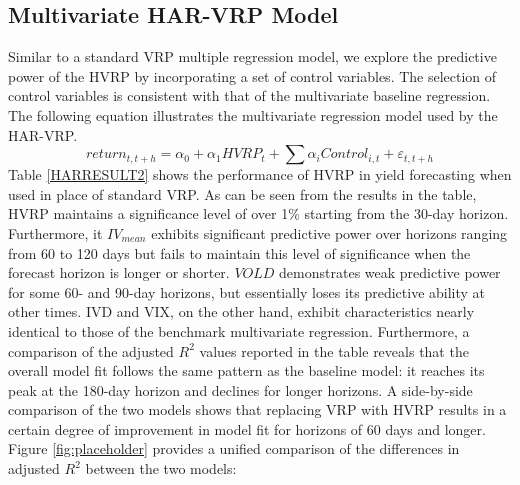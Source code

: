 \documentclass[a4paper, 12pt]{article}    %
\begin{document}
\subsection{Multivariate HAR-VRP Model}
Similar to a standard VRP multiple regression model, we explore the predictive power of the HVRP by incorporating a set of control variables. The selection of control variables is consistent with that of the multivariate baseline regression. The following equation illustrates the multivariate regression model used by the HAR-VRP.
        \begin{equation}
		return_{t,t+h} = \alpha_0 + \alpha_1 HVRP_t + \sum\alpha_i Control_{i,t} + \varepsilon_{t,t+h}
	\end{equation}
Table \ref{HARRESULT2} shows the performance of HVRP in yield forecasting when used in place of standard VRP. As can be seen from the results in the table, HVRP maintains a significance level of over 1\% starting from the 30-day horizon. Furthermore, it $IV_{mean}$ exhibits significant predictive power over horizons ranging from 60 to 120 days but fails to maintain this level of significance when the forecast horizon is longer or shorter. $VOLD$ demonstrates weak predictive power for some 60- and 90-day horizons, but essentially loses its predictive ability at other times. IVD and VIX, on the other hand, exhibit characteristics nearly identical to those of the benchmark multivariate regression.
Furthermore, a comparison of the adjusted $R^2$ values reported in the table reveals that the overall model fit follows the same pattern as the baseline model: it reaches its peak at the 180-day horizon and declines for longer horizons. A side-by-side comparison of the two models shows that replacing VRP with HVRP results in a certain degree of improvement in model fit for horizons of 60 days and longer. Figure \ref{fig:placeholder} provides a unified comparison of the differences in adjusted $R^2$ between the two models:
\end{document}
